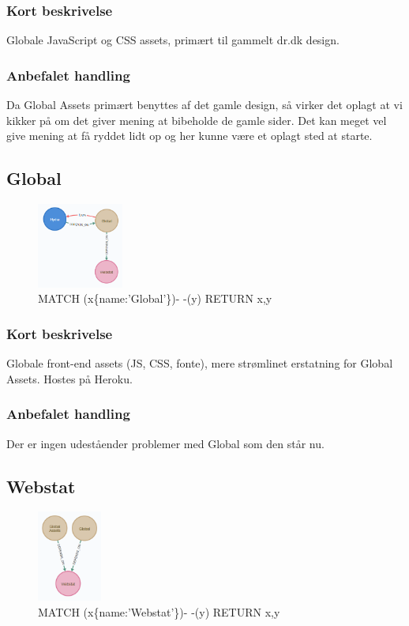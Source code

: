 \documentclass{article}
\begin{document}
\subsubsection*{Kort beskrivelse}
Globale JavaScript og CSS assets, primært til gammelt dr.dk design.
\subsubsection*{Anbefalet handling}
Da Global Assets primært benyttes af det gamle design, så virker det oplagt at vi kikker på om det giver mening at bibeholde de gamle sider. Det kan meget vel give mening at få ryddet lidt op og her kunne være et oplagt sted at starte.


\subsection{Global}
\begin{figure}[h]
\includegraphics[width=80pt]{Global.PNG}
\caption{MATCH (x\{name:'Global'\})- -(y) RETURN x,y}
\end{figure}
\subsubsection*{Kort beskrivelse}
Globale front-end assets (JS, CSS, fonte), mere strømlinet erstatning for Global Assets. Hostes på Heroku.
\subsubsection*{Anbefalet handling}
Der er ingen udeståender problemer med Global som den står nu.


\subsection{Webstat}
\begin{figure}[h]
\includegraphics[width=60pt]{Webstat.PNG}
\caption{MATCH (x\{name:'Webstat'\})- -(y) RETURN x,y}
\end{figure}
\end{document}
